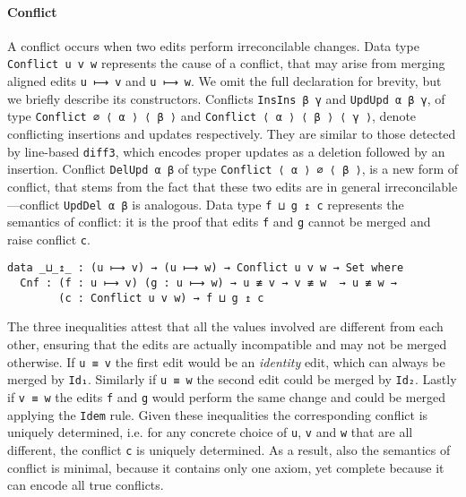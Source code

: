 \documentclass{sigplanconf}
\theoremstyle{plain}
\begin{document}
\paragraph{Conflict}
A conflict occurs when two edits perform irreconcilable changes.  
%
Data type \texttt{Conflict u v w} represents the cause of
a conflict, that may arise from merging aligned edits \texttt{u ⟼ v}
and \texttt{u ⟼ w}.
%
We omit the full declaration for brevity, but we briefly describe its
constructors.
%
Conflicts \texttt{InsIns β γ} and \texttt{UpdUpd α β γ}, of type
\texttt{Conflict ∅ ⟨ α ⟩ ⟨ β ⟩} and \texttt{Conflict ⟨ α ⟩ ⟨ β ⟩ ⟨ γ
  ⟩}, denote conflicting insertions and updates respectively.
%
They are similar to those detected by line-based \texttt{diff3}, which
encodes proper updates as a deletion followed by an insertion.
%
Conflict \texttt{DelUpd α β} of type \texttt{Conflict ⟨ α ⟩ ∅ ⟨ β ⟩},
is a new form of conflict, that stems from the fact that these two
edits are in general irreconcilable ---conflict \texttt{UpdDel α β} is analogous.
%
Data type \texttt{f ⊔ g ↥ c} represents the semantics of conflict: it
is the proof that edits \texttt{f} and \texttt{g} cannot be merged and
raise conflict \texttt{c}.
\begin{verbatim}
data _⊔_↥_ : (u ⟼ v) → (u ⟼ w) → Conflict u v w → Set where
  Cnf : (f : u ⟼ v) (g : u ⟼ w) → u ≢ v → v ≢ w  → u ≢ w → 
        (c : Conflict u v w) → f ⊔ g ↥ c
\end{verbatim}
The three inequalities attest that all the values involved are
different from each other, ensuring that the edits are actually
incompatible and may not be merged otherwise. 
%
If \texttt{u ≡ v} the first edit would be an \emph{identity} edit,
which can always be merged by \texttt{Id₁}. Similarly if \texttt{u ≡
  w} the second edit could be merged by \texttt{Id₂}. Lastly if
\texttt{v ≡ w} the edits \texttt{f} and \texttt{g} would perform the
same change and could be merged applying the \texttt{Idem} rule.
%
Given these inequalities the corresponding conflict is uniquely
determined, i.e. for any concrete choice of \texttt{u}, \texttt{v} and
\texttt{w} that are all different, the conflict \texttt{c} is uniquely
determined.
%
As a result, also the semantics of conflict is minimal, because it
contains only one axiom, yet complete because it can encode all true
conflicts.
\end{document}
